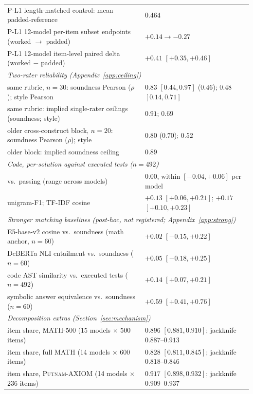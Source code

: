 \begin{table}[t]
\begin{tabular}{ll}
\quad P-L1 length-matched control: mean padded-reference \tfa{} & $0.464$ \\
\quad P-L1 12-model per-item subset endpoints (worked $\to$ padded) & $+0.14 \to -0.27$ \\
\quad P-L1 12-model item-level paired delta (worked $-$ padded) & $+0.41$ $[+0.35, +0.46]$ \\
\midrule
\multicolumn{2}{l}{\emph{Two-rater reliability (Appendix~\ref{app:ceiling})}} \\
\quad same rubric, $n{=}30$: soundness Pearson ($\rho$); style Pearson & $0.83$ $[0.44, 0.97]$ ($0.46$); $0.48$ $[0.14, 0.71]$ \\
\quad same rubric: implied single-rater ceilings (soundness; style) & $0.91$; $0.69$ \\
\quad older cross-construct block, $n{=}20$: soundness Pearson ($\rho$); style & $0.80$ ($0.70$); $0.52$ \\
\quad older block: implied soundness ceiling & $0.89$ \\
\midrule
\multicolumn{2}{l}{\emph{Code, per-solution against executed tests ($n{=}492$)}} \\
\quad \tfa{} vs.\ passing (range across models) & $0.00$, within $[-0.04, +0.06]$ per model \\
\quad unigram-F1; TF-IDF cosine & $+0.13$ $[+0.06, +0.21]$; $+0.17$ $[+0.10, +0.23]$ \\
\midrule
\multicolumn{2}{l}{\emph{Stronger matching baselines (post-hoc, not registered; Appendix~\ref{app:strong})}} \\
\quad E5-base-v2 cosine vs.\ soundness (math anchor, $n{=}60$) & $+0.02$ $[-0.15, +0.22]$ \\
\quad DeBERTa NLI entailment vs.\ soundness ($n{=}60$) & $+0.05$ $[-0.18, +0.25]$ \\
\quad code AST similarity vs.\ executed tests ($n{=}492$) & $+0.14$ $[+0.07, +0.21]$ \\
\quad symbolic answer equivalence vs.\ soundness ($n{=}60$) & $+0.59$ $[+0.41, +0.76]$ \\
\midrule
\multicolumn{2}{l}{\emph{Decomposition extras (Section~\ref{sec:mechanism})}} \\
\quad item share, \textsc{MATH-500} (15 models $\times$ 500 items) & $0.896$ $[0.881, 0.910]$; jackknife $0.887$--$0.913$ \\
\quad item share, full \textsc{MATH} (14 models $\times$ 600 items) & $0.828$ $[0.811, 0.845]$; jackknife $0.818$--$0.846$ \\
\quad item share, \textsc{Putnam-AXIOM} (14 models $\times$ 236 items) & $0.917$ $[0.898, 0.932]$; jackknife $0.909$--$0.937$ \\

\end{tabular}
\end{table}
